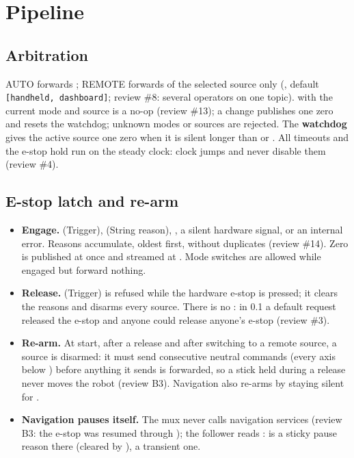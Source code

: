 \section{Pipeline}

\subsection{Arbitration}

AUTO forwards ; REMOTE forwards
 of the selected source only (,
default \texttt{[handheld, dashboard]}; review \#8: several operators on one topic).
 with the current mode and source is a no-op (review \#13); a change
publishes one zero and resets the watchdog; unknown modes or sources are rejected. The
\textbf{watchdog} gives the active source one zero when it is silent longer than
 or . All timeouts and the e-stop hold run on the
steady clock: clock jumps and  never disable them (review \#4).

\subsection{E-stop latch and re-arm}

\begin{itemize}
  \item \textbf{Engage.}  (Trigger), 
    (String reason), , a silent hardware signal, or an internal error.
    Reasons accumulate, oldest first, without duplicates (review \#14). Zero is published at once
    and streamed at . Mode switches are allowed while engaged but forward
    nothing.
  \item \textbf{Release.}  (Trigger) is refused while the hardware
    e-stop is pressed; it clears the reasons and disarms every source. There is no
    : in 0.1 a default request released the e-stop and anyone could release
    anyone's e-stop (review \#3).
  \item \textbf{Re-arm.} At start, after a release and after switching to a remote source, a
    source is disarmed: it must send  consecutive neutral commands
    (every axis below ) before anything it sends is forwarded, so a stick held
    during a release never moves the robot (review B3). Navigation also re-arms by staying silent
    for .
  \item \textbf{Navigation pauses itself.} The mux never calls navigation services (review B3:
    the e-stop was resumed through ); the follower reads :
     is a sticky pause reason there (cleared by ),
     a transient one.
\end{itemize}

